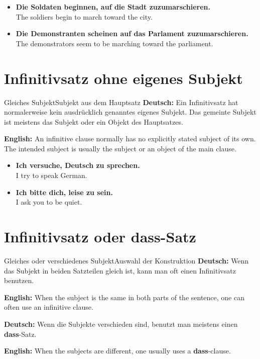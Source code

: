 \documentclass[a4paper,11pt]{article}
\newcommand{\GermanText}[1]{\textbf{Deutsch: }#1\par}
\newcommand{\EnglishText}[1]{{\small\color{SoftGray}\textbf{English: }#1\par}}
\newcommand{\ExampleItem}[2]{\item \textbf{#1}\\{\small\color{SoftGray}#2}}
\begin{document}
            \begin{exbox}
                \begin{itemize}
                    \ExampleItem{Die Soldaten beginnen, auf die Stadt zuzumarschieren.}{The soldiers begin to march toward the city.}
                    \ExampleItem{Die Demonstranten scheinen auf das Parlament zuzumarschieren.}{The demonstrators seem to be marching toward the parliament.}
                \end{itemize}
            \end{exbox}


    \section{Infinitivsatz ohne eigenes Subjekt}

        \begin{grammarentry}{Gleiches Subjekt}{Subjekt aus dem Hauptsatz}
            \GermanText{Ein Infinitivsatz hat normalerweise kein ausdrücklich genanntes eigenes Subjekt. Das gemeinte Subjekt ist meistens das Subjekt oder ein Objekt des Hauptsatzes.}
            \EnglishText{An infinitive clause normally has no explicitly stated subject of its own. The intended subject is usually the subject or an object of the main clause.}
        \end{grammarentry}

        \begin{exbox}
            \begin{itemize}
                \ExampleItem{Ich versuche, Deutsch zu sprechen.}{I try to speak German.}
                \ExampleItem{Ich bitte dich, leise zu sein.}{I ask you to be quiet.}
            \end{itemize}
        \end{exbox}


    \section{Infinitivsatz oder dass-Satz}

        \begin{grammarentry}{Gleiches oder verschiedenes Subjekt}{Auswahl der Konstruktion}
            \GermanText{Wenn das Subjekt in beiden Satzteilen gleich ist, kann man oft einen Infinitivsatz benutzen.}
            \EnglishText{When the subject is the same in both parts of the sentence, one can often use an infinitive clause.}

            \GermanText{Wenn die Subjekte verschieden sind, benutzt man meistens einen \textbf{dass}-Satz.}
            \EnglishText{When the subjects are different, one usually uses a \textbf{dass}-clause.}
        \end{grammarentry}
\end{document}
